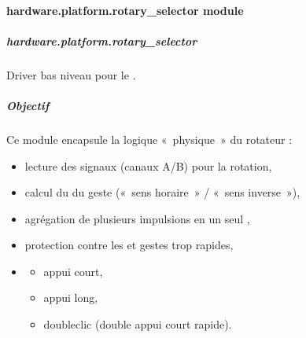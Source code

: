 \documentclass[letterpaper,10pt,french]{sphinxmanual}
\begin{document}
\paragraph{hardware.platform.rotary\_selector module}
\label{\detokenize{api/hardware.platform:module-hardware.platform.rotary_selector}}\label{\detokenize{api/hardware.platform:hardware-platform-rotary-selector-module}}

\subparagraph{hardware.platform.rotary\_selector}
\label{\detokenize{api/hardware.platform:hardware-platform-rotary-selector}}
\sphinxAtStartPar
Driver bas niveau pour le .


\subparagraph{Objectif}
\label{\detokenize{api/hardware.platform:objectif}}
\sphinxAtStartPar
Ce module encapsule la logique « physique » du rotateur :
\begin{itemize}
\item {} 
\sphinxAtStartPar
lecture des signaux  (canaux A/B) pour la rotation,

\item {} 
\sphinxAtStartPar
calcul du  du geste (« sens horaire » / « sens inverse »),

\item {} 
\sphinxAtStartPar
agrégation de plusieurs impulsions en un seul ,

\item {} 
\sphinxAtStartPar
protection contre les  et gestes trop rapides,

\item {} \begin{description}
\begin{itemize}
\item {} 
\sphinxAtStartPar
appui court,

\item {} 
\sphinxAtStartPar
appui long,

\item {} 
\sphinxAtStartPar
double\sphinxhyphen{}clic (double appui court rapide).

\end{itemize}

\end{description}

\end{itemize}
\end{document}
